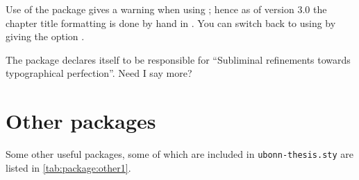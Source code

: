 Use of the  package gives a warning when using \KOMAScript{}; hence
as of version 3.0 the chapter title formatting is done by hand in .
You can switch back to using  by giving the option .

The package  declares itself to be responsible for
\enquote{Subliminal refinements towards typographical perfection}.
Need I say more?

\section{Other packages}%
\label{sec:package:other}

Some other useful packages, some of which are included in
\texttt{ubonn-thesis.sty} are listed in
\cref{tab:package:other1}.

